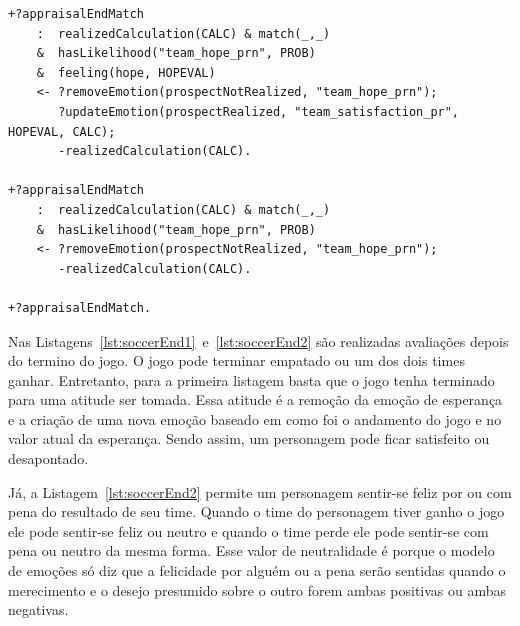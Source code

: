 \begin{center}
    \begin{minipage}{140mm}
	\lstset{linewidth=140mm}
	\begin{lstlisting}[frame=trbl,
caption=Parte do código do agente referente à avaliação do final do jogo para
as emoções de probabilidade.,
label=lst:soccerEnd1]
+?appraisalEndMatch
    :  realizedCalculation(CALC) & match(_,_)
    &  hasLikelihood("team_hope_prn", PROB)
    &  feeling(hope, HOPEVAL)
    <- ?removeEmotion(prospectNotRealized, "team_hope_prn");
       ?updateEmotion(prospectRealized, "team_satisfaction_pr", HOPEVAL, CALC);
       -realizedCalculation(CALC).

+?appraisalEndMatch
    :  realizedCalculation(CALC) & match(_,_)
    &  hasLikelihood("team_hope_prn", PROB)
    <- ?removeEmotion(prospectNotRealized, "team_hope_prn");
       -realizedCalculation(CALC).

+?appraisalEndMatch.
	\end{lstlisting}
    \end{minipage}
\end{center}

Nas Listagens~\ref{lst:soccerEnd1}~e~\ref{lst:soccerEnd2} são realizadas
avaliações depois do termino do jogo. O jogo pode terminar empatado ou um dos
dois times ganhar. Entretanto, para a primeira listagem basta que o jogo tenha
terminado para uma atitude ser tomada. Essa atitude é a remoção da emoção de
esperança e a criação de uma nova emoção baseado em como foi o andamento do
jogo e no valor atual da esperança. Sendo assim, um personagem pode ficar
satisfeito ou desapontado.

Já, a Listagem~\ref{lst:soccerEnd2} permite um personagem sentir-se feliz
por ou com pena do resultado de seu time. Quando o time do personagem
tiver ganho o jogo ele pode sentir-se feliz ou neutro e quando o time perde
ele pode sentir-se com pena ou neutro da mesma forma. Esse valor de
neutralidade é porque o modelo de emoções só diz que a felicidade por alguém
ou a pena serão sentidas quando o merecimento e o desejo presumido sobre o
outro forem ambas positivas ou ambas negativas.


